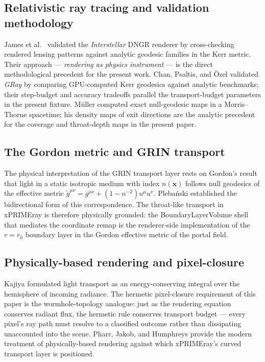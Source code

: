 \documentclass[11pt]{article}
\begin{document}
\subsection{Relativistic ray tracing and validation methodology}

James et al.\ \cite{james2015} validated the \textit{Interstellar} DNGR renderer
by cross-checking rendered lensing patterns against analytic geodesic families in
the Kerr metric.
Their approach --- \textit{rendering as physics instrument} --- is the direct
methodological precedent for the present work.
Chan, Psaltis, and \"Ozel \cite{chan2013} validated \textit{GRay} by comparing
GPU-computed Kerr geodesics against analytic benchmarks; their step-budget
and accuracy tradeoffs parallel the transport-budget parameters in the present fixture.
M\"uller \cite{muller2014} computed exact null-geodesic maps in a Morris--Thorne
spacetime; his density maps of exit directions are the analytic precedent for the
coverage and throat-depth maps in the present paper.

\subsection{The Gordon metric and GRIN transport}

The physical interpretation of the GRIN transport layer rests on Gordon's result
\cite{gordon1923} that light in a static isotropic medium with index $n(\mathbf{x})$
follows null geodesics of the effective metric
$\tilde{g}^{\mu\nu} = g^{\mu\nu}+(1-n^{-2})u^\mu u^\nu$.
Plebański \cite{plebanski1960} established the bidirectional form of this correspondence.
The throat-like transport in xPRIMEray is therefore physically grounded:
the BoundaryLayerVolume shell that mediates the coordinate remap is the
renderer-side implementation of the $r=r_0$ boundary layer in the Gordon effective
metric of the portal field.

\subsection{Physically-based rendering and pixel-closure}

Kajiya \cite{kajiya1986} formulated light transport as an energy-conserving integral
over the hemisphere of incoming radiance.
The hermetic pixel-closure requirement of this paper is the wormhole-topology analogue:
just as the rendering equation conserves radiant flux, the hermetic rule conserves
transport budget --- every pixel's ray path must resolve to a classified outcome rather
than dissipating unaccounted into the scene.
Pharr, Jakob, and Humphreys \cite{pharr2023} provide the modern treatment of
physically-based rendering against which xPRIMEray's curved transport layer is positioned.
\end{document}
